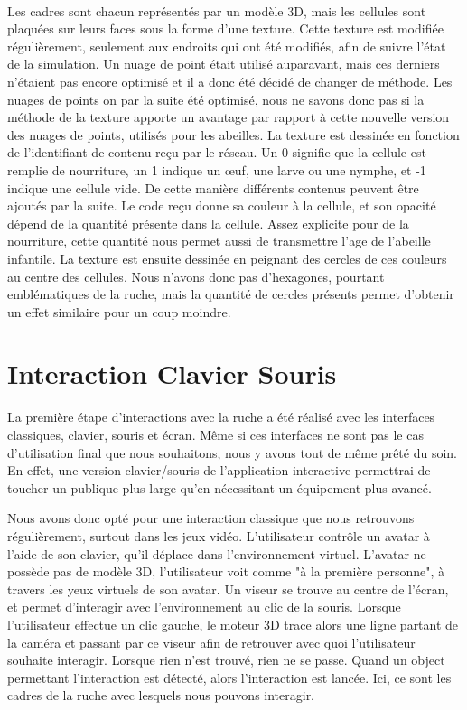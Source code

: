 		\paragraph{}
		Les cadres sont chacun représentés par un modèle 3D, mais les cellules sont plaquées sur leurs faces sous la forme d'une texture. Cette texture est modifiée régulièrement, seulement aux endroits qui ont été modifiés, afin de suivre l'état de la simulation. Un nuage de point était utilisé auparavant, mais ces derniers n'étaient pas encore optimisé et il a donc été décidé de changer de méthode. Les nuages de points on par la suite été optimisé, nous ne savons donc pas si la méthode de la texture apporte un avantage par rapport à cette nouvelle version des nuages de points, utilisés pour les abeilles. La texture est dessinée en fonction de l'identifiant de contenu reçu par le réseau. Un 0 signifie que la cellule est remplie de nourriture, un 1 indique un œuf, une larve ou une nymphe, et -1 indique une cellule vide. De cette manière différents contenus peuvent être ajoutés par la suite. Le code reçu donne sa couleur à la cellule, et son opacité dépend de la quantité présente dans la cellule. Assez explicite pour de la nourriture, cette quantité nous permet aussi de transmettre l'age de l'abeille infantile. La texture est ensuite dessinée en peignant des cercles de ces couleurs au centre des cellules. Nous n'avons donc pas d'hexagones, pourtant emblématiques de la ruche, mais la quantité de cercles présents permet d'obtenir un effet similaire pour un coup moindre.
	
	
	\section{Interaction Clavier Souris}
		La première étape d'interactions avec la ruche a été réalisé avec les interfaces classiques, clavier, souris et écran. Même si ces interfaces ne sont pas le cas d'utilisation final que nous souhaitons, nous y avons tout de même prêté du soin. En effet, une version clavier/souris de l'application interactive permettrai de toucher un publique plus large qu'en nécessitant un équipement plus avancé.
		
		Nous avons donc opté pour une interaction classique que nous retrouvons régulièrement, surtout dans les jeux vidéo. L'utilisateur contrôle un avatar à l'aide de son clavier, qu'il déplace dans l'environnement virtuel. L'avatar ne possède pas de modèle 3D, l'utilisateur voit comme "à la première personne", à travers les yeux virtuels de son avatar. Un viseur se trouve au centre de l'écran, et permet d'interagir avec l'environnement au clic de la souris. Lorsque l'utilisateur effectue un clic gauche, le moteur 3D trace alors une ligne partant de la caméra et passant par ce viseur afin de retrouver avec quoi l'utilisateur souhaite interagir. Lorsque rien n'est trouvé, rien ne se passe. Quand un object permettant l'interaction est détecté, alors l'interaction est lancée. Ici, ce sont les cadres de la ruche avec lesquels nous pouvons interagir. 
		
